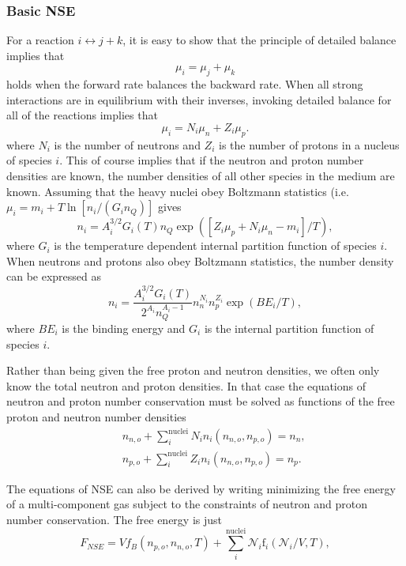 \documentclass[11pt,letter]{article}
\begin{document}
\subsubsection{Basic NSE} 
For a reaction $i \leftrightarrow j + k$, it is easy to show that the principle
of detailed balance implies that 
\begin{equation}
\mu_i = \mu_j + \mu_k 
\end{equation} 
holds when the forward rate balances the backward rate.  When all strong
interactions are in equilibrium with their inverses, invoking detailed balance
for all of the reactions implies that 
\begin{equation}
\mu_i = N_i \mu_n + Z_i \mu_p. 
\end{equation} 
where $N_i$ is the number of neutrons and $Z_i$ is the number of protons in a
nucleus of species $i$.
This of course implies that if the neutron and proton number densities are
known, the number densities of all other species in the medium are known.
Assuming that the heavy nuclei obey Boltzmann statistics (i.e. $\mu_i = m_i + T
\ln \left[n_i/(G_i n_Q)\right]$ gives 
\begin{equation}
\label{eq:nse1}
n_i = A_i^{3/2} G_i(T) n_Q \exp\left(\left[Z_i \mu_p + N_i \mu_n
- m_i \right]/T\right), 
\end{equation} 
where $G_i$ is the temperature dependent internal partition function of species
$i$.  When neutrons and protons also obey Boltzmann statistics, the number
density can be expressed as 
\begin{equation} 
n_i = \frac{A_i^{3/2} G_i(T)}{2^{A_i}n_Q^{A_i-1}}  n_n^{N_i} n_p^{Z_i}
\exp(BE_i/T), 
\end{equation} 
where $BE_i$ is the binding energy and $G_i$ is the internal partition function
of species $i$.  

Rather than being given the free proton and neutron densities, we often
only know the total neutron and proton densities.  In that case the equations of
neutron and proton number conservation must be solved as functions of the free
proton and neutron number densities
\begin{eqnarray}
\label{eq:nse2}
&&n_{n,o} + \sum_i^\textrm{nuclei} N_i n_i(n_{n,o}, n_{p,o}) = n_n, \\
\label{eq:nse3}
&&n_{p,o} + \sum_i^\textrm{nuclei} Z_i n_i(n_{n,o}, n_{p,o}) = n_p.
\end{eqnarray}  

The equations of NSE can also be derived by writing minimizing the free energy of a 
multi-component gas subject to the constraints of neutron and proton number
conservation.  The free energy is just 
\begin{equation}
F_{NSE} = V f_B(n_{p,o}, n_{n,o}, T) +  
\sum^{\textrm{nuclei}}_i \mathcal{N}_i \mathrm{f}_i(\mathcal{N}_i/V, T), 
\end{equation} 
\end{document}
